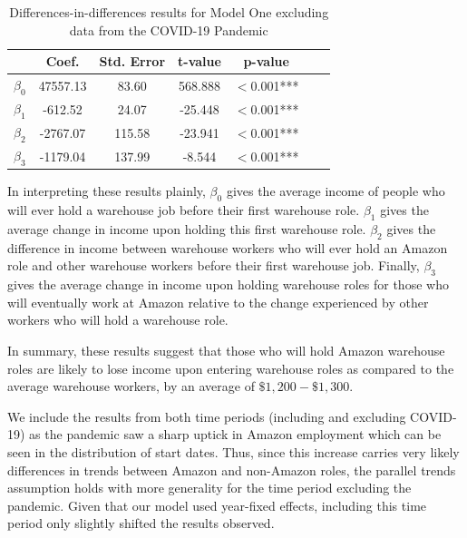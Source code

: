 \documentclass[11pt]{article}
\begin{document}
\begin{table}[H]
\centering
\begin{tabular}[H]{lcccccc}
\toprule
&Coef.&Std. Error&t-value&p-value &\\
\midrule
$\beta_0$& 47557.13 & 83.60 & 568.888 & $<$0.001***\\
$\beta_1$& -612.52 & 24.07 & -25.448 & $<$0.001***\\
$\beta_2$& -2767.07 & 115.58 & -23.941 & $<$0.001***\\
$\beta_3$& -1179.04 & 137.99 & -8.544 & $<$0.001***\\
\bottomrule
\end{tabular}
\caption{Differences-in-differences results for Model One excluding data from the COVID-19 Pandemic}
\end{table}%

\-\hspace{0.5cm} In interpreting these results plainly, $\beta_0$ gives the average income of people who will ever hold a warehouse job before their first warehouse role. $\beta_1$ gives the average change in income upon holding this first warehouse role. $\beta_2$ gives the difference in income between warehouse workers who will ever hold an Amazon role and other warehouse workers before their first warehouse job. Finally, $\beta_3$ gives the average change in income upon holding warehouse roles for those who will eventually work at Amazon relative to the change experienced by other workers who will hold a warehouse role. 

\-\hspace{0.5cm} In summary, these results suggest that those who will hold Amazon warehouse roles are likely to lose income upon entering warehouse roles as compared to the average warehouse workers, by an average of $\$1,200-\$1,300.$

\-\hspace{0.5cm} We include the results from both time periods (including and excluding COVID-19) as the pandemic saw a sharp uptick in Amazon employment which can be seen in the distribution of start dates. Thus, since this increase carries very likely differences in trends between Amazon and non-Amazon roles, the parallel trends assumption holds with more generality for the time period excluding the pandemic. Given that our model used year-fixed effects, including this time period only slightly shifted the results observed. 
\end{document}
